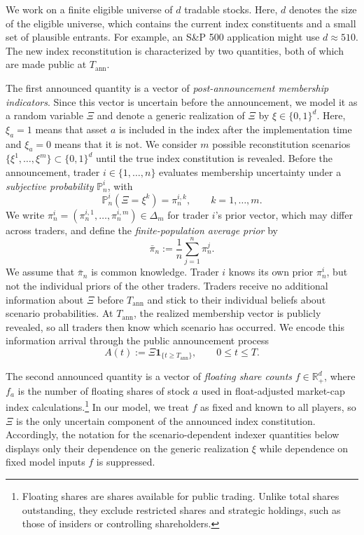 \documentclass[12pt]{article}
\numberwithin{equation}{section}
\theoremstyle{definition}
\begin{document}
We work on a finite eligible universe of $d$
tradable stocks. Here, $d$ denotes the size of the eligible universe, which
contains the current index constituents and a small set of plausible entrants. For
example, an S\&P 500 application might use $d\approx 510$.
The new index reconstitution is characterized by two quantities, both of which
are made public at \(T_{\mathrm{ann}}\).

The first announced quantity is a vector of \emph{post-announcement membership
indicators}. Since this vector is uncertain before the announcement, we model
it as a random variable \(\Xi\) and denote a generic realization of \(\Xi\) by
\(\xi\in\{0,1\}^d\). Here, $\xi_a=1$ means that asset $a$ is included in the
index after the implementation time and $\xi_a=0$ means that it is not. We consider
\(m\) possible reconstitution scenarios \(\{\xi^1,\dots,\xi^m\}\subset\{0,1\}^d\) until
the true index constitution is revealed. Before the announcement, trader \(i\in\{1,\dots,n\}\) evaluates membership
uncertainty under a \emph{subjective probability} \(\mathbb P_n^i\), with
\[
\mathbb P_n^i(\Xi=\xi^k)=\pi_n^{i,k},
\qquad k=1,\dots,m.
\]
We write \(\pi_n^i=(\pi_n^{i,1},\dots,\pi_n^{i,m})\in\Delta_m\) for trader \(i\)'s
prior vector, which may differ across traders, and define the \emph{finite-population
average prior} by
\begin{equation}\label{eq:finite_population_average_prior}
\bar\pi_n:=\frac{1}{n}\sum_{j=1}^n\pi_n^j.
\end{equation}
We assume that \(\bar\pi_n\) is common knowledge. Trader \(i\) knows its own
prior \(\pi_n^i\), but not the individual priors of the other traders.
Traders receive no additional information about
\(\Xi\) before \(T_{\mathrm{ann}}\) and stick to their individual beliefs about
scenario probabilities. At
\(T_{\mathrm{ann}}\), the realized membership vector is publicly revealed, so
all traders then know which scenario has occurred.
We encode this information arrival through the public announcement process
\begin{equation}\label{eq:announcement_process}
A(t):=\Xi\mathbf 1_{\{t\geq T_{\mathrm{ann}}\}},
\qquad 0\leq t\leq T.
\end{equation}

The second announced quantity is a vector of \emph{floating share counts}
$f\in\mathbb{R}_+^d$, where $f_a$ is the number of floating shares of stock
$a$ used in float-adjusted market-cap index calculations.\footnote{Floating
shares are shares available for public trading. Unlike total shares
outstanding, they exclude restricted shares and strategic holdings, such as
those of insiders or controlling shareholders.}
In our model, we treat \(f\) as fixed and known to all players, so \(\Xi\) is the only
uncertain component of the announced index constitution. Accordingly, the
notation for the scenario-dependent indexer quantities below displays only
their dependence on the generic realization \(\xi\) while dependence on fixed model
inputs \(f\) is suppressed.
\end{document}
